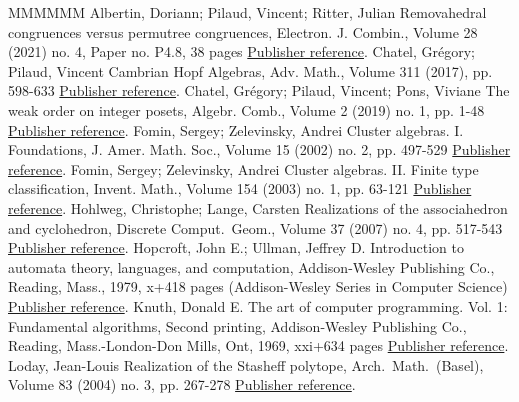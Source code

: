 \begin{thebibliography}{MMMMMM}
 Albertin, Doriann; Pilaud, Vincent; Ritter, Julian Removahedral congruences versus permutree congruences, Electron. J. Combin., Volume 28 (2021) no. 4, Paper no. P4.8, 38 pages \href{https://alco.centre-mersenne.org/articles/10.5802/alco.249/#AlbertinPilaudRitter-Removahedra}{Publisher reference}.
 Chatel, Grégory; Pilaud, Vincent Cambrian Hopf Algebras, Adv. Math., Volume 311 (2017), pp. 598-633 \href{https://alco.centre-mersenne.org/articles/10.5802/alco.249/#ChatelPilaud}{Publisher reference}.
 Chatel, Grégory; Pilaud, Vincent; Pons, Viviane The weak order on integer posets, Algebr. Comb., Volume 2 (2019) no. 1, pp. 1-48 \href{https://alco.centre-mersenne.org/articles/10.5802/alco.249/#ChatelPilaudPons}{Publisher reference}.
 Fomin, Sergey; Zelevinsky, Andrei Cluster algebras. I. Foundations, J. Amer. Math. Soc., Volume 15 (2002) no. 2, pp. 497-529 \href{https://alco.centre-mersenne.org/articles/10.5802/alco.249/#FominZelevinsky-ClusterAlgebrasI}{Publisher reference}.
 Fomin, Sergey; Zelevinsky, Andrei Cluster algebras. II. Finite type classification, Invent. Math., Volume 154 (2003) no. 1, pp. 63-121 \href{https://alco.centre-mersenne.org/articles/10.5802/alco.249/#FominZelevinsky-ClusterAlgebrasII}{Publisher reference}.
 Hohlweg, Christophe; Lange, Carsten Realizations of the associahedron and cyclohedron, Discrete Comput. Geom., Volume 37 (2007) no. 4, pp. 517-543 \href{https://alco.centre-mersenne.org/articles/10.5802/alco.249/#HohlwegLange}{Publisher reference}.
 Hopcroft, John E.; Ullman, Jeffrey D. Introduction to automata theory, languages, and computation, Addison-Wesley Publishing Co., Reading, Mass., 1979, x+418 pages (Addison-Wesley Series in Computer Science) \href{https://alco.centre-mersenne.org/articles/10.5802/alco.249/#HopcroftUllman}{Publisher reference}.
 Knuth, Donald E. The art of computer programming. Vol. 1: Fundamental algorithms, Second printing, Addison-Wesley Publishing Co., Reading, Mass.-London-Don Mills, Ont, 1969, xxi+634 pages \href{https://alco.centre-mersenne.org/articles/10.5802/alco.249/#Knuth-TAOCP1}{Publisher reference}.
 Loday, Jean-Louis Realization of the Stasheff polytope, Arch. Math. (Basel), Volume 83 (2004) no. 3, pp. 267-278 \href{https://alco.centre-mersenne.org/articles/10.5802/alco.249/#Loday}{Publisher reference}.

\end{thebibliography}
